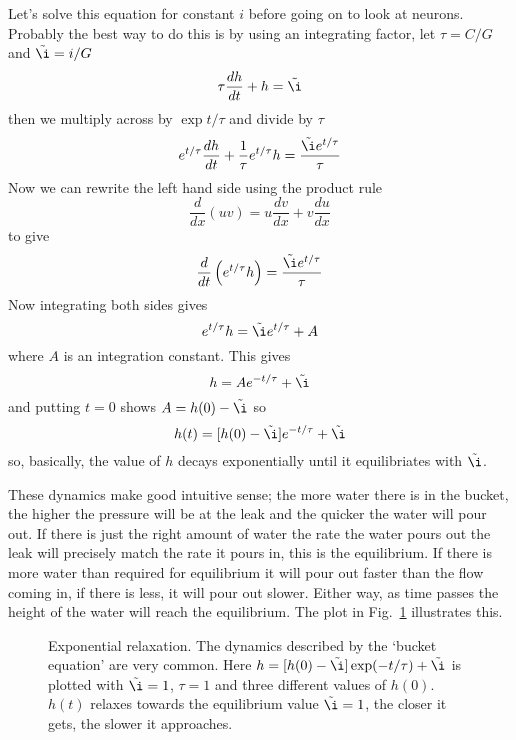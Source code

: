 \documentclass[11pt,a4paper]{scrartcl}
\begin{document}
Let's solve this equation for constant $i$ before going on to look at
neurons. Probably the best way to do this is by using an integrating
factor, let $\tau=C/G$ and $\tilde{\i}=i/G$
\begin{equation}
\tau\frac{dh}{dt}+h=\tilde{\i}
\end{equation}
then we multiply across by $\exp{t/\tau}$ and divide by $\tau$
\begin{equation}
e^{t/\tau}\frac{dh}{dt}+\frac{1}{\tau}e^{t/\tau}h=\frac{\tilde{\i}e^{t/\tau}}{\tau}
\end{equation}
Now we can rewrite the left hand side using the product rule
\begin{equation}
\frac{d}{dx}(uv)=u\frac{dv}{dx}+v\frac{du}{dx}
\end{equation}
to give
\begin{equation}
\frac{d}{dt}\left(e^{t/\tau}h\right)=\frac{\tilde{\i}e^{t/\tau}}{\tau}
\end{equation}
Now integrating both sides gives
\begin{equation}
e^{t/\tau}h=\tilde{\i}e^{t/\tau}+A
\end{equation}
where $A$ is an integration constant. This gives
\begin{equation}
h=Ae^{-t/\tau}+\tilde{\i}
\end{equation}
and putting $t=0$ shows $A=h(0)-\tilde{\i}$ so
\begin{equation}
h(t)=[h(0)-\tilde{\i}]e^{-t/\tau}+\tilde{\i}
\end{equation}
so, basically, the value of $h$ decays exponentially until it
equilibriates with $\tilde{\i}$.

These dynamics make good intuitive sense; the more water there is in
the bucket, the higher the pressure will be at the leak and the
quicker the water will pour out. If there is just the right amount of
water the rate the water pours out the leak will precisely match the
rate it pours in, this is the equilibrium. If there is more water than
required for equilibrium it will pour out faster than the flow coming
in, if there is less, it will pour out slower. Either way, as time
passes the height of the water will reach the equilibrium. The plot in
Fig.~\ref{bucket_v} illustrates this.

\begin{figure}
\begin{center}

\end{center}
\caption{Exponential relaxation. The dynamics described by the
  \lq{}bucket equation\rq{} are very common. Here
  $h=[h(0)-\tilde{\i}]\exp(-t/\tau)+\tilde{\i}$ is plotted with
  $\tilde{\i}=1$, $\tau=1$ and three different values of
  $h(0)$. $h(t)$ relaxes towards the equilibrium value $\tilde{\i}=1$,
  the closer it gets, the slower it approaches.\label{bucket_v}}
\end{figure}
\end{document}
